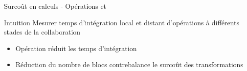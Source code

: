 \begin{frame}{Surcoût en calculs - Opérations \ins et \rmv}
    \begin{block}{Intuition}
        Mesurer temps d'intégration \alert{local} et \alert{distant} d'opérations \ins à différents stades de la collaboration
    \end{block}
    \pause
    \vspace{-0.5cm}
    \begin{figure}[!ht]
        \centering
    \end{figure}
    \vspace{-0.3cm}
    \begin{itemize}
        \item<3-> Opération \ren réduit les temps d'intégration
        \item<4> Réduction du nombre de blocs contrebalance le surcoût des transformations
    \end{itemize}
\end{frame}


